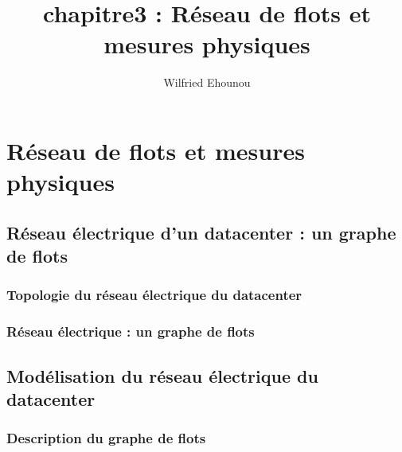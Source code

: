 \documentclass[onecolumn, 12pt]{book}
\title{chapitre3 : R\'eseau de flots et mesures physiques}
\author{Wilfried Ehounou}
\date{\oldstylenums{\today}}
\begin{document}
\maketitle
\tableofcontents
\chapter{R\'eseau de flots et mesures physiques}
	

	\section{R\'eseau \'electrique d'un datacenter : un graphe de flots}
		\subsection{Topologie du r\'eseau \'electrique du datacenter}
			
		\subsection{R\'eseau \'electrique : un graphe de flots}
			
		
		
	\section{Mod\'elisation du r\'eseau \'electrique du datacenter}
		\subsection{Description du graphe de flots}
			
\end{document}
